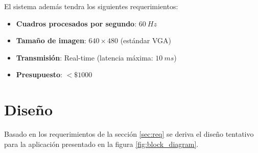\documentclass[10pt, letterpaper, conference]{IEEEtran}
\begin{document}
El sistema adem\'as tendra los siguientes requerimientos:

\begin{itemize}
  \item \textbf{Cuadros procesados por segundo}: $60\ Hz$
  \item \textbf{Tamaño de imagen}: $640\times480$ (est\'andar VGA)
  \item \textbf{Transmisi\'on}: Real-time (latencia m\'axima: $10\ ms$)
  \item \textbf{Presupuesto}: $< \$ 1000$
\end{itemize}


\section{Diseño}
\label{sec:design}

Basado en los requerimientos de la secci\'on \ref{sec:req} se deriva
el diseño tentativo para la aplicaci\'on presentado en la figura
\ref{fig:block_diagram}.
\end{document}
